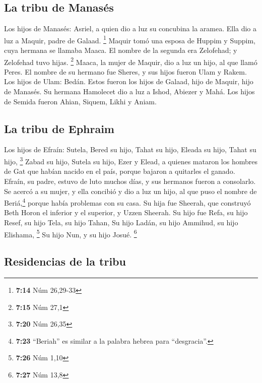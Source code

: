 \hypertarget{la-tribu-de-manasuxe9s}{%
\subsection{La tribu de Manasés}\label{la-tribu-de-manasuxe9s}}

 Los hijos de Manasés: Asriel, a quien dio a luz su
concubina la aramea. Ella dio a luz a Maquir, padre de Galaad.
\footnote{\textbf{7:14} Núm 26,29-33}  Maquir tomó una
esposa de Huppim y Suppim, cuya hermana se llamaba Maaca. El nombre de
la segunda era Zelofehad; y Zelofehad tuvo hijas. \footnote{\textbf{7:15}
  Núm 27,1}  Maaca, la mujer de Maquir, dio a luz un
hijo, al que llamó Peres. El nombre de su hermano fue Sheres, y sus
hijos fueron Ulam y Rakem.  Los hijos de Ulam: Bedán.
Estos fueron los hijos de Galaad, hijo de Maquir, hijo de Manasés.
 Su hermana Hamolecet dio a luz a Ishod, Abiezer y Mahá.
 Los hijos de Semida fueron Ahian, Siquem, Likhi y Aniam.

\hypertarget{la-tribu-de-ephraim}{%
\subsection{La tribu de Ephraim}\label{la-tribu-de-ephraim}}

 Los hijos de Efraín: Sutela, Bered su hijo, Tahat su
hijo, Eleada su hijo, Tahat su hijo, \footnote{\textbf{7:20} Núm 26,35}
 Zabad su hijo, Sutela su hijo, Ezer y Elead, a quienes
mataron los hombres de Gat que habían nacido en el país, porque bajaron
a quitarles el ganado.  Efraín, su padre, estuvo de luto
muchos días, y sus hermanos fueron a consolarlo.  Se
acercó a su mujer, y ella concibió y dio a luz un hijo, al que puso el
nombre de Beriá,\footnote{\textbf{7:23} ``Beriah'' es similar a la
  palabra hebrea para ``desgracia''.} porque había problemas con su
casa.  Su hija fue Sheerah, que construyó Beth Horon el
inferior y el superior, y Uzzen Sheerah.  Su hijo fue
Refa, su hijo Resef, su hijo Tela, su hijo Tahan,  Su
hijo Ladán, su hijo Ammihud, su hijo Elishama, \footnote{\textbf{7:26}
  Núm 1,10}  Su hijo Nun, y su hijo Josué. \footnote{\textbf{7:27}
  Núm 13,8}

\hypertarget{residencias-de-la-tribu}{%
\subsection{Residencias de la tribu}\label{residencias-de-la-tribu}}


